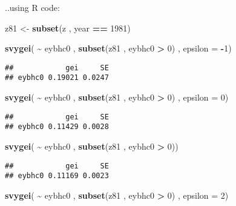 \documentclass[
]{book}
\newenvironment{Shaded}{\begin{snugshade}}{\end{snugshade}}
\newcommand{\AttributeTok}[1]{\textcolor[rgb]{0.13,0.29,0.53}{#1}}
\newcommand{\DecValTok}[1]{\textcolor[rgb]{0.00,0.00,0.81}{#1}}
\newcommand{\FunctionTok}[1]{\textcolor[rgb]{0.13,0.29,0.53}{\textbf{#1}}}
\newcommand{\NormalTok}[1]{#1}
\newcommand{\OtherTok}[1]{\textcolor[rgb]{0.56,0.35,0.01}{#1}}
\newcommand{\SpecialCharTok}[1]{\textcolor[rgb]{0.81,0.36,0.00}{\textbf{#1}}}
\begin{document}
..using R code:

\begin{Shaded}
\begin{Highlighting}[]
\NormalTok{z81 }\OtherTok{\textless{}{-}} \FunctionTok{subset}\NormalTok{(z , year }\SpecialCharTok{==} \DecValTok{1981}\NormalTok{)}

\FunctionTok{svygei}\NormalTok{( }\SpecialCharTok{\textasciitilde{}}\NormalTok{ eybhc0 , }\FunctionTok{subset}\NormalTok{(z81 , eybhc0 }\SpecialCharTok{\textgreater{}} \DecValTok{0}\NormalTok{) , }\AttributeTok{epsilon =} \SpecialCharTok{{-}}\DecValTok{1}\NormalTok{)}
\end{Highlighting}
\end{Shaded}

\begin{verbatim}
##            gei     SE
## eybhc0 0.19021 0.0247
\end{verbatim}

\begin{Shaded}
\begin{Highlighting}[]
\FunctionTok{svygei}\NormalTok{( }\SpecialCharTok{\textasciitilde{}}\NormalTok{ eybhc0 , }\FunctionTok{subset}\NormalTok{(z81 , eybhc0 }\SpecialCharTok{\textgreater{}} \DecValTok{0}\NormalTok{) , }\AttributeTok{epsilon =} \DecValTok{0}\NormalTok{)}
\end{Highlighting}
\end{Shaded}

\begin{verbatim}
##            gei     SE
## eybhc0 0.11429 0.0028
\end{verbatim}

\begin{Shaded}
\begin{Highlighting}[]
\FunctionTok{svygei}\NormalTok{( }\SpecialCharTok{\textasciitilde{}}\NormalTok{ eybhc0 , }\FunctionTok{subset}\NormalTok{(z81 , eybhc0 }\SpecialCharTok{\textgreater{}} \DecValTok{0}\NormalTok{))}
\end{Highlighting}
\end{Shaded}

\begin{verbatim}
##            gei     SE
## eybhc0 0.11169 0.0023
\end{verbatim}

\begin{Shaded}
\begin{Highlighting}[]
\FunctionTok{svygei}\NormalTok{( }\SpecialCharTok{\textasciitilde{}}\NormalTok{ eybhc0 , }\FunctionTok{subset}\NormalTok{(z81 , eybhc0 }\SpecialCharTok{\textgreater{}} \DecValTok{0}\NormalTok{) , }\AttributeTok{epsilon =} \DecValTok{2}\NormalTok{)}
\end{Highlighting}
\end{Shaded}
\end{document}
